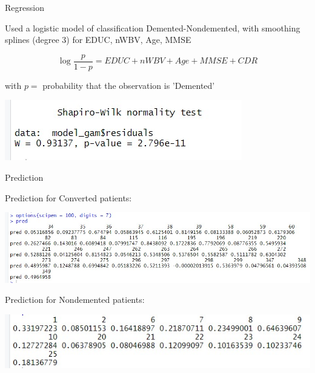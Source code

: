 \documentclass{beamer}
\begin{document}
	
	\begin{frame}{Regression}
	
	\vspace{0.3cm}
		
		
		
		Used a logistic model of classification Demented-Nondemented, with smoothing splines (degree 3) for EDUC, nWBV, Age, MMSE
		
		$$ \log \frac{p}{1-p} = EDUC + nWBV + Age + MMSE + CDR$$
		
		\vspace{0.2cm}
		with $p =$ probability that the observation is 'Demented'
		
	
	
		\begin{center}
			\includegraphics[width=0.6\columnwidth]{regr1.jpeg}
		\end{center}
		
		
	\end{frame}
	
	\begin{frame}{Prediction}
	
	Prediction for Converted patients:
	\begin{center}
		\includegraphics[width=\columnwidth]{prediction.jpeg}
	\end{center}

	Prediction for Nondemented patients:
	\begin{center}
		\includegraphics[width=0.8\columnwidth]{prediction2.jpeg}
	\end{center}	

		
	\end{frame}
\end{document}
